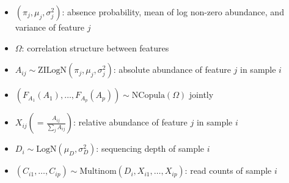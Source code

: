 \documentclass{article}%
\begin{document}
	\begin{itemize}[leftmargin=0.4cm]
	\setlength\itemsep{0em}
		\item $(\pi_j, \mu_j, \sigma_j^2)$: absence probability, mean of log non-zero abundance, and variance of feature $j$
		\item $\Omega$: correlation structure between features
		\item $A_{ij} \sim \text{ZILogN}(\pi_j, \mu_j, \sigma_j^2)$: absolute abundance of feature $j$ in sample $i$
		\item $(F_{A_1}(A_1), \dots, F_{A_p}(A_p)) \sim \text{NCopula}(\Omega)$ jointly
		\item $X_{ij} (= \frac{A_{ij}}{\sum_j A_{ij}})$: relative abundance of feature $j$ in sample $i$
		\item $D_i \sim \text{LogN}(\mu_D, \sigma^2_D)$: sequencing depth of sample $i$
		\item $(C_{i1}, \dots, C_{ip}) \sim \text{Multinom}(D_i, X_{i1}, \dots, X_{ip})$: read counts of sample $i$
	\end{itemize}
\end{document}

